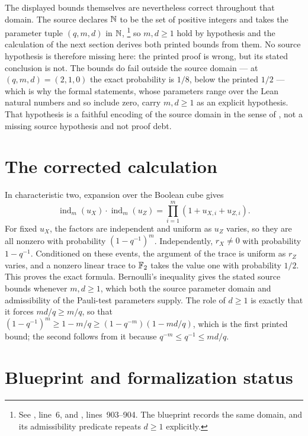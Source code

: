 \documentclass[11pt]{article}
\newcommand{\ind}{\operatorname{ind}}
\begin{document}
The displayed bounds themselves are nevertheless correct throughout that
domain.  The source declares $\mathbb{N}$ to be the set of positive integers and takes
the parameter tuple $(q,m,d)$ in $\mathbb{N}$,%
\footnote{See , line~6, and
,
lines~903--904.  The blueprint records the same domain, and its admissibility
predicate repeats $d\geq1$ explicitly.}
so $m,d\geq1$ hold by hypothesis and the calculation of the next section
derives both printed bounds from them.  No source hypothesis is therefore
missing here: the printed proof is wrong, but its stated conclusion is not.
The bounds do fail outside the source domain --- at $(q,m,d)=(2,1,0)$ the exact
probability is $1/8$, below the printed $1/2$ --- which is why the formal
statements, whose parameters range over the Lean natural numbers and so include
zero, carry $m,d\geq1$ as an explicit hypothesis.  That hypothesis is a
faithful encoding of the source domain in the sense of
, not a missing source hypothesis
and not proof debt.

\section{The corrected calculation}

In characteristic two, expansion over the Boolean cube gives
\[
  \ind_m(u_X)\cdot\ind_m(u_Z)
  =\prod_{i=1}^m(1+u_{X,i}+u_{Z,i}).
\]
For fixed $u_X$, the factors are independent and uniform as $u_Z$ varies, so
they are all nonzero with probability $(1-q^{-1})^m$.  Independently,
$r_X\ne0$ with probability $1-q^{-1}$.  Conditioned on these events, the
argument of the trace is uniform as $r_Z$ varies, and a nonzero linear trace
to $\mathbb{F}_2$ takes the value one with probability $1/2$.  This proves the exact
formula.  Bernoulli's inequality gives the stated source bounds whenever
$m,d\geq1$, which both the source parameter domain and admissibility of the
Pauli-test parameters supply.  The role of $d\geq1$ is exactly that it forces
$md/q\geq m/q$, so that
$(1-q^{-1})^m\geq1-m/q\geq(1-q^{-m})(1-md/q)$, which is the first printed
bound; the second follows from it because $q^{-m}\leq q^{-1}\leq md/q$.

\section{Blueprint and formalization status}
\end{document}
